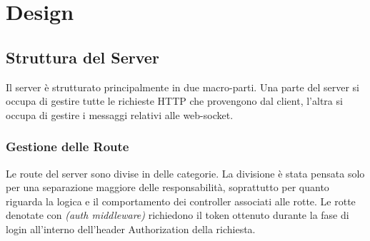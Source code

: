 \chapter{Design}
\section{Struttura del Server}
Il server è strutturato principalmente in due macro-parti. Una parte del server si occupa di gestire tutte le richieste HTTP che provengono dal client, l'altra si occupa di gestire i messaggi relativi alle web-socket.

\subsection{Gestione delle Route}
Le route del server sono divise in delle categorie. La divisione è stata pensata solo per una separazione maggiore delle responsabilità, soprattutto per quanto riguarda la logica e il comportamento dei controller associati alle rotte.
Le rotte denotate con \textit{(auth middleware)} richiedono il token ottenuto durante la fase di login all'interno dell'header Authorization della richiesta.
